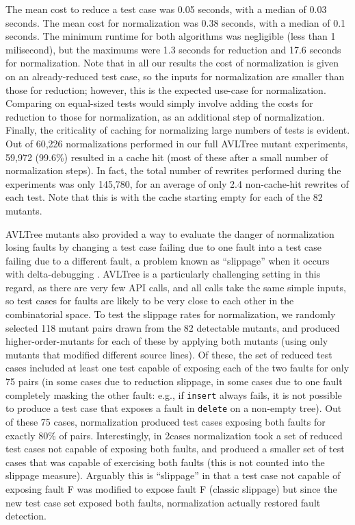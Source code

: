 The mean cost to reduce a
test case was 0.05 seconds, with a median of 0.03 seconds.  The mean
cost for normalization was 0.38 seconds, with a median of 0.1 seconds.
The minimum runtime for both algorithms was negligible (less than 1
milisecond), but the maximums were 1.3 seconds for reduction and 17.6
seconds for normalization.  Note that in all our results the cost of
normalization is given on an already-reduced test case, so the inputs
for normalization are smaller than those for reduction; however, this
is the expected use-case for normalization.  Comparing on equal-sized
tests would simply involve adding the costs for reduction to those for
normalization, as an additional step of normalization.  Finally, the
criticality of caching for normalizing large numbers of tests is
evident.  Out of 60,226 normalizations performed in our full AVLTree mutant
experiments, 59,972 (99.6\%) resulted in a cache hit (most of these
after a small number of normalization steps).  In fact, the total
number of rewrites performed during the experiments was only 145,780,
for an average of only 2.4 non-cache-hit rewrites of each test.  Note
that this is with the cache starting empty for each of the 82 mutants.

AVLTree mutants also provided a way to evaluate the danger of
normalization losing faults by changing a test case failing due to one
fault into a test case failing due to a different fault, a problem
known as ``slippage'' when it occurs with delta-debugging
\cite{PLDI13}.  AVLTree is a particularly challenging setting in this
regard, as there are very few API calls, and all calls take the same
simple inputs, so test cases for faults are likely to be very close to
each other in the combinatorial space.  To test the slippage rates for
normalization, we randomly selected 118 mutant pairs drawn from the 82
detectable mutants, and produced higher-order-mutants for each of
these by applying both mutants (using only mutants that modified
different source lines).  Of these, the set of reduced test cases
included at least one test capable of exposing each of the two faults
for only 75 pairs (in some cases due to reduction slippage, in some
cases due to one fault completely masking the other fault:  e.g., if
{\tt insert} always fails, it is not possible to produce a test case
that exposes a fault in {\tt delete} on a non-empty tree).  Out of
these 75 cases, normalization produced test cases exposing both faults
for exactly 80\% of pairs.  Interestingly, in 2cases normalization took
a set of reduced test cases not capable of exposing both faults, and
produced a smaller set of test cases that was capable of exercising
both faults (this is not counted into the slippage measure).
Arguably this is ``slippage'' in that a test case not capable of
exposing fault F was modified to expose fault F (classic slippage) but
since the new test case set exposed both faults, normalization
actually restored fault detection.

